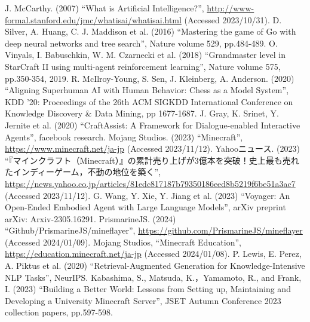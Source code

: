 \begin{thebibliography}{99}
    J. McCarthy. (2007) 
    ``What is Artificial Intelligence?'', 
    \url{http://www-formal.stanford.edu/jmc/whatisai/whatisai.html} (Accessed 2023/10/31).
    D. Silver, A. Huang, C. J. Maddison et al. (2016) 
    ``Mastering the game of Go with deep neural networks and tree search'', 
    Nature volume 529, pp.484-489.
    O. Vinyals, I. Babuschkin, W. M. Czarnecki et al. (2018) 
    ``Grandmaster level in StarCraft II using multi-agent reinforcement learning'', 
    Nature volume 575, pp.350-354, 2019.
    R. McIlroy-Young, S. Sen, J. Kleinberg, A. Anderson. (2020) 
    ``Aligning Superhuman AI with Human Behavior: Chess as a Model System'',
    KDD '20: Proceedings of the 26th ACM SIGKDD International Conference on Knowledge Discovery \& Data Mining, pp 1677-1687.
    J. Gray, K. Srinet, Y. Jernite et al. (2020)
    ``CraftAssist: A Framework for Dialogue-enabled Interactive Agents'',
    facebook research.
    Mojang Studios. (2023)
    ``Minecraft'', 
    \url{https://www.minecraft.net/ja-jp} (Accessed 2023/11/12).
    Yahooニュース. (2023)
    ``『マインクラフト（Minecraft）』の累計売り上げが3億本を突破！史上最も売れたインディーゲーム，不動の地位を築く'',
    \url{https://news.yahoo.co.jp/articles/81edc817187b79350186eed8b5219f6be51a3ac7} (Accessed 2023/11/12).
    G. Wang, Y. Xie, Y. Jiang et al. (2023)
    ``Voyager: An Open-Ended Embodied Agent with Large Language Models'', 
    arXiv preprint arXiv: Arxiv-2305.16291.
    PrismarineJS. (2024) 
    ``Github/PrismarineJS/mineflayer'', 
    \url{https://github.com/PrismarineJS/mineflayer} (Accessed 2024/01/09).
    Mojang Studios, 
    ``Minecraft Education'', 
    \url{https://education.minecraft.net/ja-jp} (Accessed 2024/01/08).
    P. Lewis, E. Perez, A. Piktus et al. (2020) 
    ``Retrieval-Augmented Generation for Knowledge-Intensive NLP Tasks'', 
    NeurIPS.
    Kabashima, S., Matsuda, K.，Yamamoto, R., and Frank, I. (2023) 
    ``Building a Better World: Lessons from Setting up, Maintaining and Developing a University Minecraft Server'',
    JSET Autumn Conference 2023 collection papers, pp.597-598.
\end{thebibliography}
